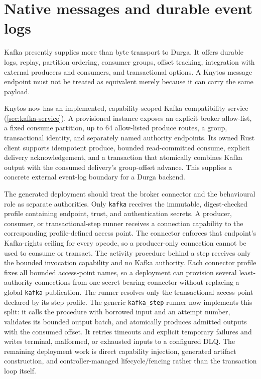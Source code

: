 \section{Native messages and durable event logs}

Kafka presently supplies more than byte transport to Durga. It offers durable
logs, replay, partition ordering, consumer groups, offset tracking, integration
with external producers and consumers, and transactional options. A Knytos
message endpoint must not be treated as equivalent merely because it can carry
the same payload.

Knytos now has an implemented, capability-scoped Kafka compatibility
service (\autoref{sec:kafka-service}). A provisioned instance exposes an
explicit broker allow-list, a fixed consume partition, up to 64 allow-listed produce routes, a
group, transactional identity, and separately named authority endpoints. Its
owned Rust client supports idempotent produce, bounded read-committed consume,
explicit delivery acknowledgement, and a transaction that atomically combines
Kafka output with the consumed delivery's group-offset advance. This supplies
a concrete external event-log boundary for a Durga backend.

The generated deployment should treat the broker connector and the behavioural
role as separate authorities. Only \texttt{kafka} receives the immutable,
digest-checked profile containing endpoint, trust, and authentication
secrets. A producer, consumer, or transactional-step runner receives a
connection capability to the corresponding profile-defined access point. The
connector enforces that endpoint's Kafka-rights ceiling for every opcode, so a
producer-only connection cannot be used to consume or transact. The activity procedure behind a step
receives only the bounded invocation capability and no Kafka authority.
Each connector profile fixes all bounded access-point names, so a deployment
can provision several least-authority connections from one secret-bearing
connector without replacing a global \texttt{kafka} publication. The runner
resolves only the transactional access point declared by its step profile.
The generic \texttt{kafka\_step} runner now implements this split: it calls the
procedure with borrowed input and an attempt number, validates its bounded
output batch, and atomically produces admitted outputs with the consumed
offset. It retries timeouts and explicit temporary failures and writes terminal,
malformed, or exhausted inputs to a configured DLQ. The remaining deployment
work is direct capability injection, generated artifact construction, and
controller-managed lifecycle/fencing rather than the transaction loop itself.


